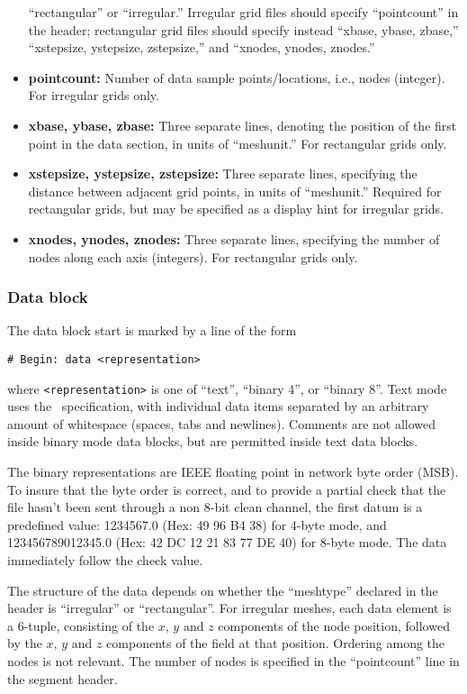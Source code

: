 \begin{itemize}
   ``rectangular'' or
   ``irregular.''  Irregular grid files should specify ``pointcount''
   in the header; rectangular grid files should specify instead
   ``xbase, ybase, zbase,'' ``xstepsize, ystepsize, zstepsize,'' and
   ``xnodes, ynodes, znodes.''
\item {\bf pointcount:} Number of data sample points/locations, i.e.,
   nodes (integer).  For irregular grids only.
\item {\bf xbase, ybase, zbase:} Three separate lines, denoting the
   position of the first point in the data section, in units of
   ``meshunit.''  For rectangular grids only.
\item {\bf xstepsize, ystepsize, zstepsize:} Three separate lines,
   specifying the distance between adjacent grid points, in units
   of ``meshunit.''  Required for rectangular grids, but may be
   specified as a display hint for irregular grids.
\item {\bf xnodes, ynodes, znodes:} Three separate lines, specifying
   the number of nodes along each axis (integers).  For
   rectangular grids only.
\end{itemize}

\subsubsection{Data block}
The data block start is marked by a line of the form
\begin{verbatim}
# Begin: data <representation>
\end{verbatim}
where \texttt{<representation>} is one of ``text'', ``binary 4'', or
``binary 8''.  Text mode uses the \ASCII\ specification, with
individual data items separated by an arbitrary amount of whitespace
(spaces, tabs and newlines).  Comments are not allowed inside binary
mode data blocks, but are permitted inside text data blocks.

The binary representations are IEEE floating point in network byte
order (MSB).  To insure that the byte order is correct, and to provide
a partial check that the file hasn't been sent through a non 8-bit
clean channel, the first datum is a predefined value: 1234567.0 (Hex:
49 96 B4 38) for 4-byte mode, and 123456789012345.0 (Hex: 42 DC 12 21
83 77 DE 40) for 8-byte mode.  The data immediately follow the check
value.

The structure of the data depends on whether the ``meshtype'' declared
in the header is ``irregular'' or ``rectangular''.  For irregular
meshes, each data element is a 6-tuple, consisting of the $x$, $y$ and
$z$ components of the node position, followed by the $x$, $y$ and $z$
components of the field at that position.  Ordering among the nodes is
not relevant.  The number of nodes is specified in the ``pointcount''
line in the segment header.

